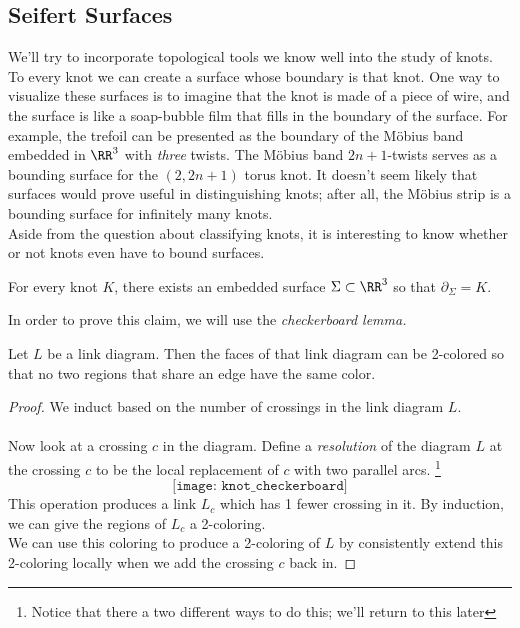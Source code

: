 \subsection{Seifert Surfaces}
We'll try to incorporate topological tools we know well into the study of knots.  To every knot we can create a surface whose boundary is that knot. One way to visualize these surfaces is to imagine that the knot is made of a piece of wire, and the surface is like a soap-bubble film that fills in the boundary of the surface. For example, the trefoil can be presented as the boundary of the M\"obius band embedded in $\RR^3$ with \emph{three} twists. The M\"obius band $2n+1$-twists serves as a bounding surface for the $(2, 2n+1)$ torus knot. It doesn't seem likely that surfaces would prove useful in distinguishing knots; after all, the M\"obius strip is a bounding surface for infinitely many knots. \\
Aside from the question about classifying knots, it is interesting to know whether or not knots even have to bound surfaces. 
\begin{claim}
For every knot $K$, there exists an embedded surface $\Sigma\subset \RR^3$ so that $\partial_\Sigma= K$. 
\end{claim}
In order to prove this claim, we will use the \emph{checkerboard lemma.}
\begin{lemma}
Let $L$ be a link diagram. Then the faces of that link diagram can be 2-colored so that no two regions that share an edge have the same color. 
\end{lemma}
\begin{proof}
We induct based on the number of crossings in the link diagram $L$.\\
\\
Now look at a crossing $c$ in the diagram. Define a \emph{resolution} of the diagram $L$ at the crossing $c$ to be the local replacement of $c$ with two parallel arcs. \footnote{Notice that there a two different ways to do this; we'll return to this later}  
\[\texttt{[image: knot\_checkerboard]}\] This operation produces a link $L_c$ which has 1 fewer crossing in it. By induction, we can give the regions of $L_c$ a 2-coloring. \\
We can use this coloring to produce a 2-coloring of $L$ by consistently extend this 2-coloring locally when we add the crossing $c$ back in. 
\end{proof}
